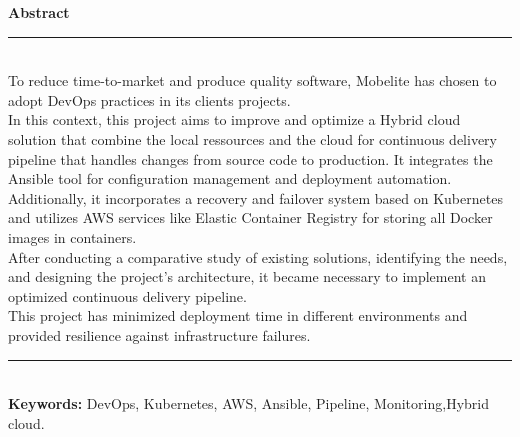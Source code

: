 \begin{spacing}{1.3}

\textbf{\centering\Large Abstract}\\
\noindent\rule[2pt]{\textwidth}{2pt}\\[1.2cm]
To reduce time-to-market and produce quality software, Mobelite has chosen to adopt DevOps practices in its clients projects.\\[0.3cm]
In this context, this project aims to improve and optimize a Hybrid cloud solution that combine the local ressources and the cloud for continuous delivery pipeline that handles changes from source code to production. It integrates the Ansible tool for configuration management and deployment automation. Additionally, it incorporates a recovery and failover system based on Kubernetes and utilizes AWS services like Elastic Container Registry for storing all Docker images in containers.\\[0.3cm]
After conducting a comparative study of existing solutions, identifying the needs, and designing the project's architecture, it became necessary to implement an optimized continuous delivery pipeline.\\[0.3cm]
This project has minimized deployment time in different environments and provided resilience against infrastructure failures.\\[1.3cm]

\noindent\rule[2pt]{\textwidth}{2pt}\\[1.2cm]
\textbf{\Large Keywords:}
DevOps, Kubernetes, AWS, Ansible, Pipeline, Monitoring,Hybrid cloud.\\[0.3cm]
\end{spacing}
